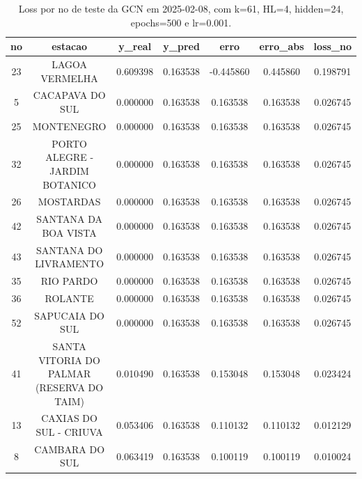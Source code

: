 \begin{table}[h]
\centering
\caption{Loss por no de teste da GCN em 2025-02-08, com k=61, HL=4, hidden=24, epochs=500 e lr=0.001.}
\label{tab:gcn_loss_k61_hl4_h24_e500_d20250208}
\begin{tabular}{ccccccc}
\toprule
no & estacao & y\_real & y\_pred & erro & erro\_abs & loss\_no \\
\midrule
23 & LAGOA VERMELHA & 0.609398 & 0.163538 & -0.445860 & 0.445860 & 0.198791 \\
5 & CACAPAVA DO SUL & 0.000000 & 0.163538 & 0.163538 & 0.163538 & 0.026745 \\
25 & MONTENEGRO & 0.000000 & 0.163538 & 0.163538 & 0.163538 & 0.026745 \\
32 & PORTO ALEGRE - JARDIM BOTANICO & 0.000000 & 0.163538 & 0.163538 & 0.163538 & 0.026745 \\
26 & MOSTARDAS & 0.000000 & 0.163538 & 0.163538 & 0.163538 & 0.026745 \\
42 & SANTANA DA BOA VISTA & 0.000000 & 0.163538 & 0.163538 & 0.163538 & 0.026745 \\
43 & SANTANA DO LIVRAMENTO & 0.000000 & 0.163538 & 0.163538 & 0.163538 & 0.026745 \\
35 & RIO PARDO & 0.000000 & 0.163538 & 0.163538 & 0.163538 & 0.026745 \\
36 & ROLANTE & 0.000000 & 0.163538 & 0.163538 & 0.163538 & 0.026745 \\
52 & SAPUCAIA DO SUL & 0.000000 & 0.163538 & 0.163538 & 0.163538 & 0.026745 \\
41 & SANTA VITORIA DO PALMAR (RESERVA DO TAIM) & 0.010490 & 0.163538 & 0.153048 & 0.153048 & 0.023424 \\
13 & CAXIAS DO SUL - CRIUVA & 0.053406 & 0.163538 & 0.110132 & 0.110132 & 0.012129 \\
8 & CAMBARA DO SUL & 0.063419 & 0.163538 & 0.100119 & 0.100119 & 0.010024 \\
\bottomrule
\end{tabular}
\end{table}
